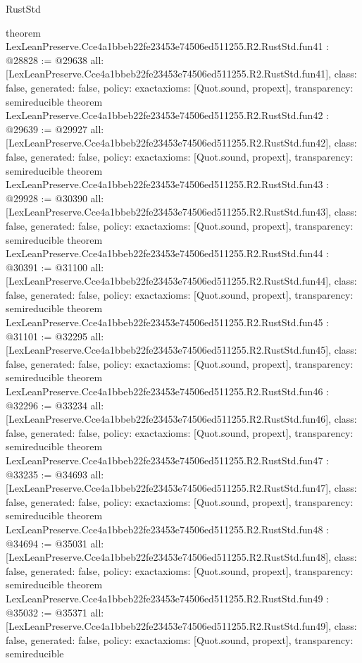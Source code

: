 \begin{lexlean}{RustStd}
\begin{coremodule}
{}
theorem LexLeanPreserve.Cce4a1bbeb22fe23453e74506ed511255.R2.RustStd.fun41 : @28828 := @29638 {
  all: [LexLeanPreserve.Cce4a1bbeb22fe23453e74506ed511255.R2.RustStd.fun41],
  class: false,
  generated: false,
  policy: exact{axioms: [Quot.sound, propext]},
  transparency: semireducible
}
theorem LexLeanPreserve.Cce4a1bbeb22fe23453e74506ed511255.R2.RustStd.fun42 : @29639 := @29927 {
  all: [LexLeanPreserve.Cce4a1bbeb22fe23453e74506ed511255.R2.RustStd.fun42],
  class: false,
  generated: false,
  policy: exact{axioms: [Quot.sound, propext]},
  transparency: semireducible
}
theorem LexLeanPreserve.Cce4a1bbeb22fe23453e74506ed511255.R2.RustStd.fun43 : @29928 := @30390 {
  all: [LexLeanPreserve.Cce4a1bbeb22fe23453e74506ed511255.R2.RustStd.fun43],
  class: false,
  generated: false,
  policy: exact{axioms: [Quot.sound, propext]},
  transparency: semireducible
}
theorem LexLeanPreserve.Cce4a1bbeb22fe23453e74506ed511255.R2.RustStd.fun44 : @30391 := @31100 {
  all: [LexLeanPreserve.Cce4a1bbeb22fe23453e74506ed511255.R2.RustStd.fun44],
  class: false,
  generated: false,
  policy: exact{axioms: [Quot.sound, propext]},
  transparency: semireducible
}
theorem LexLeanPreserve.Cce4a1bbeb22fe23453e74506ed511255.R2.RustStd.fun45 : @31101 := @32295 {
  all: [LexLeanPreserve.Cce4a1bbeb22fe23453e74506ed511255.R2.RustStd.fun45],
  class: false,
  generated: false,
  policy: exact{axioms: [Quot.sound, propext]},
  transparency: semireducible
}
theorem LexLeanPreserve.Cce4a1bbeb22fe23453e74506ed511255.R2.RustStd.fun46 : @32296 := @33234 {
  all: [LexLeanPreserve.Cce4a1bbeb22fe23453e74506ed511255.R2.RustStd.fun46],
  class: false,
  generated: false,
  policy: exact{axioms: [Quot.sound, propext]},
  transparency: semireducible
}
theorem LexLeanPreserve.Cce4a1bbeb22fe23453e74506ed511255.R2.RustStd.fun47 : @33235 := @34693 {
  all: [LexLeanPreserve.Cce4a1bbeb22fe23453e74506ed511255.R2.RustStd.fun47],
  class: false,
  generated: false,
  policy: exact{axioms: [Quot.sound, propext]},
  transparency: semireducible
}
theorem LexLeanPreserve.Cce4a1bbeb22fe23453e74506ed511255.R2.RustStd.fun48 : @34694 := @35031 {
  all: [LexLeanPreserve.Cce4a1bbeb22fe23453e74506ed511255.R2.RustStd.fun48],
  class: false,
  generated: false,
  policy: exact{axioms: [Quot.sound, propext]},
  transparency: semireducible
}
theorem LexLeanPreserve.Cce4a1bbeb22fe23453e74506ed511255.R2.RustStd.fun49 : @35032 := @35371 {
  all: [LexLeanPreserve.Cce4a1bbeb22fe23453e74506ed511255.R2.RustStd.fun49],
  class: false,
  generated: false,
  policy: exact{axioms: [Quot.sound, propext]},
  transparency: semireducible
}
\end{coremodule}
\end{lexlean}
